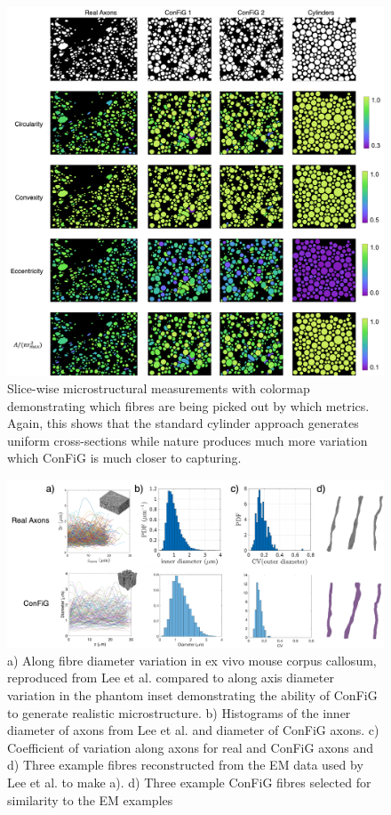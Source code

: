 \begin{figure}
  \centering
  \includegraphics[width=\textwidth]{figures/micro/slice_wise_metrics_colormap_whitebg}
  \caption[Slice-wise microstructural measurements with colormap]{Slice-wise microstructural measurements with colormap demonstrating which fibres are being picked out by which metrics. Again, this shows that the standard cylinder approach generates uniform cross-sections while nature produces much more variation which \ac{ConFiG} is much closer to capturing.}
  \label{fig:micro_slice_wise_colormap}
\end{figure}


\begin{figure}
  \centering
  \includegraphics[width=\textwidth]{figures/config/diameter_dist_NEW_whitebg.png}
  \caption[Diameter distributions of real and \ac{ConFiG} axons]{a) Along fibre diameter variation in ex vivo mouse corpus callosum, reproduced from Lee et al. \cite{Lee2019b} compared to along axis diameter variation in the phantom inset demonstrating the ability of \ac{ConFiG} to generate realistic microstructure. b) Histograms of the inner diameter of axons from Lee et al. \cite{Lee2019b} and diameter of \ac{ConFiG} axons. c) Coefficient of variation along axons for real and \ac{ConFiG} axons and d) Three example fibres reconstructed from the \ac{EM} data used by Lee et al. to make a). d) Three example \ac{ConFiG} fibres selected for similarity to the \ac{EM} examples }
  \label{fig:config_res_diameter_dist}
\end{figure}

